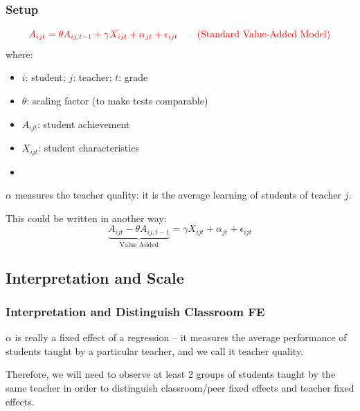         \subsubsection{Setup}
            \begin{equation}
                \color{red}
                A_{ijt} = \theta A_{ij,t-1} + \gamma X_{ijt} + \alpha_{jt} + \epsilon_{ijt}
                \tag{Standard Value-Added Model}
                \label{eqn:edu_value_add_m}
            \end{equation}
            where:
            \begin{itemize}
                \item $i$: student; $j$: teacher; $t$: grade
                \item $\theta$: scaling factor (to make tests comparable)
                \item $A_{ijt}$: student achievement
                \item $X_{ijt}$: student characteristics
                \item {}
            \end{itemize}
            $\alpha$ measures the teacher quality: it is the average learning of students of teacher $j$.
            
            This could be written in another way:
            \begin{equation*}
                \underbrace{A_{ijt} - \theta A_{ij,t-1}}_{\text{Value Added}} = \gamma X_{ijt} + \alpha_{jt} + \epsilon_{ijt}
            \end{equation*}
        
    \subsection{Interpretation and Scale}
        
        \subsubsection{Interpretation and Distinguish Classroom FE}
            $\alpha$ is really a fixed effect of a regression -- it measures the average performance of students taught by a particular teacher, and we call it teacher quality.
            
            Therefore, we will need to observe at least 2 groups of students taught by the same teacher in order to distinguish classroom/peer fixed effects and teacher fixed effects. 
        
